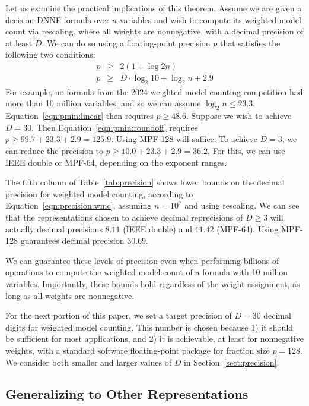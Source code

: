 \documentclass[
hf
]{ceurart}
\begin{document}
Let us examine the practical implications of this theorem.  Assume we are given a decision-DNNF formula over $n$
variables and wish to compute its weighted model count via rescaling, where all weights are nonnegative, with a decimal
precision of at least $D$.  We can do so using a floating-point precision $p$ that satisfies the following two conditions:
\begin{eqnarray}
  p & \geq & 2(1 + \log2 n) \label{eqn:pmin:linear} \\
  p & \geq & D \cdot \log_2 10 +\log_2 n + 2.9 \label{eqn:pmin:roundoff}
\end{eqnarray}
For example, no formula from the 2024 weighted model counting
competition had more than 10 million variables, and so we can assume
$\log_2 n \leq 23.3$.  Equation~\ref{eqn:pmin:linear} then requires $p
\geq 48.6$.  Suppose we wish to achieve $D = 30$.  Then
Equation~\ref{eqn:pmin:roundoff} requires $p \geq 99.7 + 23.3 + 2.9 =
125.9$.  Using MPF-128 will suffice.  To achieve $D=3$, we
can reduce the precision to $p \geq 10.0 + 23.3 + 2.9 = 36.2$.  For
this, we can use IEEE double or MPF-64, depending on the exponent ranges.

The fifth column of Table~\ref{tab:precision} shows lower bounds on
the decimal precision for weighted model counting, according to Equation~\ref{eqn:precision:wmc},
assuming $n = 10^7$ and using rescaling.  We can see that the
representations chosen to achieve decimal reprecisions of $D\geq 3$
will actually decimal precisions $8.11$ (IEEE double) and $11.42$
(MPF-64).  Using MPF-128 guarantees decimal precision $30.69$.

We can guarantee these levels of precision 
even when 
performing billions of operations to
compute the weighted model count of a formula with 10 million variables.
Importantly, these bounds hold regardless of the weight assignment, as long as all weights are nonnegative.

For the next portion of this paper, we set a target precision of $D=30$ decimal digits for
weighted model counting.  This number is chosen because 1) it should be
sufficient for most applications, and 2) it
is achievable, at least for nonnegative weights, with a standard software floating-point package for fraction size $p=128$.
We consider both smaller and larger values of $D$ in Section~\ref{sect:precision}.

\subsection{Generalizing to Other Representations}
\label{sect:ddnnf}
\end{document}
